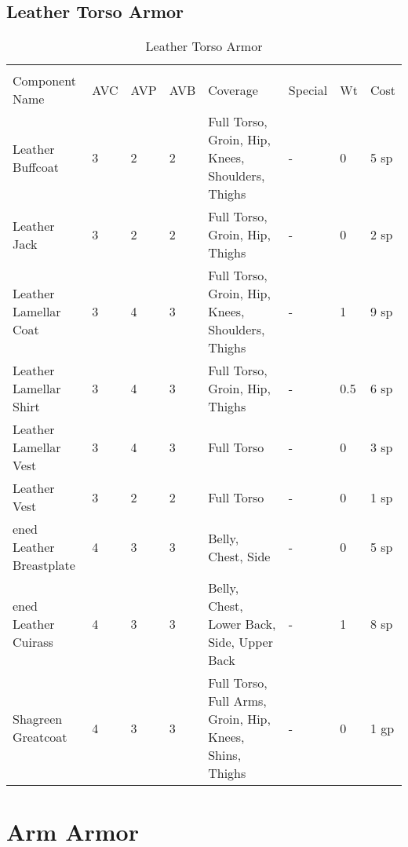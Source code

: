\documentclass[oneside,11pt,english]{book}
\begin{document}
\subsection{Leather Torso Armor}
\begin{longtabu}to 
  \captionsetup{textformat=empty, labelformat=blank}
  \caption{Leather Torso Armor} \vspace{-15pt}
  \label{tab:Leather Torso Armor}\\
  Component Name&AVC&AVP&AVB& Coverage& Special& Wt&Cost\\\toprule
  Leather Buffcoat& 3& 2& 2& Full Torso, Groin, Hip, Knees, Shoulders, Thighs &-& 0& 5 sp\\
  Leather Jack& 3& 2& 2& Full Torso, Groin, Hip, Thighs &-& 0& 2 sp\\
  Leather Lamellar Coat& 3& 4& 3& Full Torso, Groin, Hip, Knees, Shoulders, Thighs &-& 1& 9 sp\\
  Leather Lamellar Shirt& 3& 4& 3& Full Torso, Groin, Hip, Thighs &-& 0.5& 6 sp\\
  Leather Lamellar Vest& 3& 4& 3& Full Torso &-& 0& 3 sp\\
  Leather Vest& 3& 2& 2& Full Torso &-& 0& 1 sp\\
  ened Leather Breastplate& 4& 3& 3& Belly, Chest, Side &-& 0& 5 sp\\
  ened Leather Cuirass& 4& 3& 3& Belly, Chest, Lower Back, Side, Upper Back &-& 1& 8 sp\\
  Shagreen Greatcoat& 4& 3& 3& Full Torso, Full Arms, Groin, Hip, Knees, Shins, Thighs &-& 0& 1 gp\\
\end{longtabu}

\section{Arm Armor}
\end{document}
